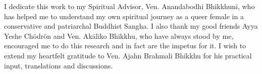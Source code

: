 \bigskip
\bigskip
\bigskip
\bigskip
\small I dedicate this work to my Spiritual Advisor, Ven. Anandabodhi Bhikkhunī, who has helped me to understand my own spiritual journey as a queer female in a conservative and patriarchal Buddhist Sangha. I also thank my good friends Ayya Yeshe Chödrön and Ven. Akāliko Bhikkhu, who have always stood by me, encouraged me to do this research and in fact are the impetus for it. I wish to extend my heartfelt gratitude to Ven. Ajahn Brahmali Bhikkhu for his practical input, translations and discussions.
